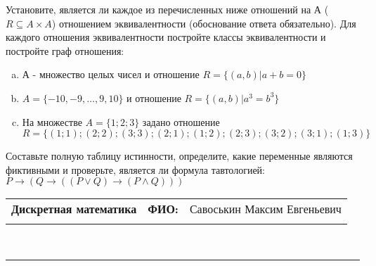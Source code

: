 \documentclass[10pt]{exam}
\newcommand{\class}{Дискретная математика}
\newcommand{\examdate}{}
\begin{document}
\begin{questions}
\question
Установите, является ли каждое из перечисленных ниже отношений на А ($R \subseteq A \times A$) отношением эквивалентности (обоснование ответа обязательно). Для каждого отношения эквивалентности 
постройте классы эквивалентности и постройте граф отношения:
\begin{enumerate}[a)]\setcounter{enumi}{0}
\item А - множество целых чисел и отношение $R = \{(a,b)|a + b = 0\}$
\item $A = \{-10, -9, …, 9, 10\}$ и отношение $R = \{(a,b)|a^{3} = b^{3}\}$
\item На множестве $A = \{1; 2; 3\}$ задано отношение $R = \{(1; 1); (2; 2); (3; 3); (2; 1); (1; 2); (2; 3); (3; 2); (3; 1); (1; 3)\}$

\end{enumerate}\question Составьте полную таблицу истинности, определите, какие переменные являются фиктивными и проверьте, является ли формула тавтологией:
$ P \rightarrow (Q \rightarrow ((P \lor Q) \rightarrow (P \land Q)))$

\end{questions}
\newpage
\begin{flushright}
\begin{tabular}{p{2.8in} r l}
\textbf{\class} & \textbf{ФИО:} &Савоськин Максим Евгеньевич
\\

\textbf{\examdate} &&\\
\end{tabular}\\
\end{flushright}
\rule[1ex]{\textwidth}{.1pt}
\end{document}
